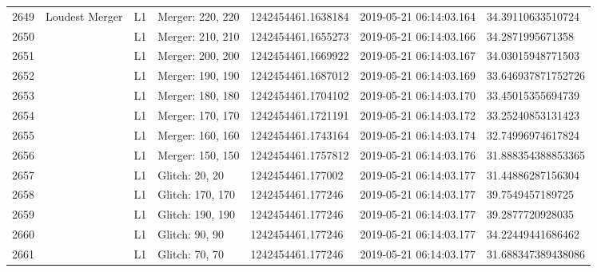 \begin{longtable}{lllllll}
2649 &                                     Loudest Merger &       L1 &  Merger: 220, 220 &  1242454461.1638184 &  2019-05-21 06:14:03.164 &   34.39110633510724 \\
2650 &                                                    &       L1 &  Merger: 210, 210 &  1242454461.1655273 &  2019-05-21 06:14:03.166 &    34.2871995671358 \\
2651 &                                                    &       L1 &  Merger: 200, 200 &  1242454461.1669922 &  2019-05-21 06:14:03.167 &   34.03015948771503 \\
2652 &                                                    &       L1 &  Merger: 190, 190 &  1242454461.1687012 &  2019-05-21 06:14:03.169 &  33.646937871752726 \\
2653 &                                                    &       L1 &  Merger: 180, 180 &  1242454461.1704102 &  2019-05-21 06:14:03.170 &   33.45015355694739 \\
2654 &                                                    &       L1 &  Merger: 170, 170 &  1242454461.1721191 &  2019-05-21 06:14:03.172 &   33.25240853131423 \\
2655 &                                                    &       L1 &  Merger: 160, 160 &  1242454461.1743164 &  2019-05-21 06:14:03.174 &   32.74996974617824 \\
2656 &                                                    &       L1 &  Merger: 150, 150 &  1242454461.1757812 &  2019-05-21 06:14:03.176 &  31.888354388853365 \\
2657 &                                                    &       L1 &    Glitch: 20, 20 &   1242454461.177002 &  2019-05-21 06:14:03.177 &   31.44886287156304 \\
2658 &                                                    &       L1 &  Glitch: 170, 170 &   1242454461.177246 &  2019-05-21 06:14:03.177 &    39.7549457189725 \\
2659 &                                                    &       L1 &  Glitch: 190, 190 &   1242454461.177246 &  2019-05-21 06:14:03.177 &    39.2877720928035 \\
2660 &                                                    &       L1 &    Glitch: 90, 90 &   1242454461.177246 &  2019-05-21 06:14:03.177 &   34.22449441686462 \\
2661 &                                                    &       L1 &    Glitch: 70, 70 &   1242454461.177246 &  2019-05-21 06:14:03.177 &  31.688347389438086 \\

\end{longtable}
